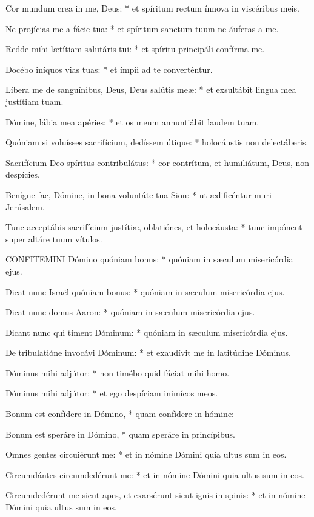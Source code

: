 Cor mundum crea in me, Deus: * et spíritum rectum ínnova in viscéribus meis.

Ne projícias me a fácie tua: * et spíritum sanctum tuum ne áuferas a me.

Redde mihi lætítiam salutáris tui: * et spíritu principáli confírma me.

Docébo iníquos vias tuas: * et ímpii ad te converténtur.

Líbera me de sanguínibus, Deus, Deus salútis meæ: * et exsultábit lingua mea justítiam tuam.

Dómine, lábia mea apéries: * et os meum annuntiábit laudem tuam.

Quóniam si voluísses sacrifícium, dedíssem útique: * holocáustis non delectáberis.

Sacrifícium Deo spíritus contribulátus: * cor contrítum, et humiliátum, Deus, non despícies.

Benígne fac, Dómine, in bona voluntáte tua Sion: * ut ædificéntur muri Jerúsalem.

Tunc acceptábis sacrifícium justítiæ, oblatiónes, et holocáusta: * tunc impónent super altáre tuum vítulos.


\lettrine[lines=2]{C}{ONFITEMINI} Dómino quóniam bonus: * quóniam in sæculum misericórdia ejus.

Dicat nunc Israël quóniam bonus: * quóniam in sæculum misericórdia ejus.

Dicat nunc domus Aaron: * quóniam in sæculum misericórdia ejus.

Dicant nunc qui timent Dóminum: * quóniam in sæculum misericórdia ejus.

De tribulatióne invocávi Dóminum: * et exaudívit me in latitúdine Dóminus.

Dóminus mihi adjútor: * non timébo quid fáciat mihi homo.

Dóminus mihi adjútor: * et ego despíciam inimícos meos.

Bonum est confídere in Dómino, * quam confídere in hómine:

Bonum est speráre in Dómino, * quam speráre in princípibus.

Omnes gentes circuiérunt me: * et in nómine Dómini quia ultus sum in eos.

Circumdántes circumdedérunt me: * et in nómine Dómini quia ultus sum in eos.

Circumdedérunt me sicut apes, et exarsérunt sicut ignis in spinis: * et in nómine Dómini quia ultus sum in eos.

